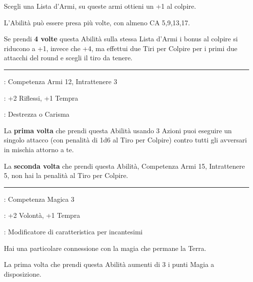 \begin{multicols}{2}
Scegli una Lista d'Armi, su queste armi ottieni un +1 al colpire.

L'Abilità può essere presa più volte, con almeno CA 5,9,13,17.

Se prendi \textbf{4 volte} questa Abilità sulla stessa Lista d'Armi i bonus al colpire si riducono a +1, invece che +4, ma effettui due Tiri per Colpire per i primi due attacchi del round e scegli il tiro da tenere.

\smallskip\noindent\rule{\linewidth}{2pt} \hypertarget{Attacco Turbinante}{}\medskip{}
\noindent
\begin{description}[noitemsep, topsep=0pt, parsep=0pt, partopsep=0pt, leftmargin=0cm, labelwidth=2.5cm]
    \item[\textbf{Requisito}]: Competenza Armi 12, Intrattenere 3
    \item[\textbf{Tiri Salvezza}]: +2 Riflessi, +1 Tempra
    \item[\textbf{Caratteristica}]: Destrezza o Carisma
\end{description}

La \textbf{prima volta} che prendi questa Abilità usando 3 Azioni puoi eseguire un singolo attacco (con penalità di 1d6 al Tiro per Colpire) contro tutti gli avversari in mischia attorno a te.

La \textbf{seconda volta} che prendi questa Abilità, Competenza Armi 15, Intrattenere 5, non hai la penalità al Tiro per Colpire.

\smallskip\noindent\rule{\linewidth}{2pt} \hypertarget{Batteria Magica}{}\medskip{}
\noindent
\begin{description}[noitemsep, topsep=0pt, parsep=0pt, partopsep=0pt, leftmargin=0cm, labelwidth=2.5cm]
    \item[\textbf{Requisito}]: Competenza Magica 3
    \item[\textbf{Tiri Salvezza}]: +2 Volontà, +1 Tempra
    \item[\textbf{Caratteristica}]: Modificatore di caratteristica per incantesimi
\end{description}

Hai una particolare connessione con la magia che permane la Terra.

La prima volta che prendi questa Abilità aumenti di 3 i punti Magia a disposizione.


\end{multicols}
